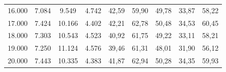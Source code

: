 \begin{table}[ht!]
\begin{tabular}{lcccccccc}
16.000              & 7.084          & 9.549          & 4.742          & 42,59                                                             & 59,90                                                          & 49,78                                                           & 33,87                                                               & 58,22                                                             \\
17.000              & 7.424          & 10.166         & 4.402          & 42,21                                                             & 62,78                                                          & 50,48                                                           & 34,53                                                               & 60,45                                                             \\
18.000              & 7.303          & 10.543         & 4.523          & 40,92                                                             & 61,75                                                          & 49,22                                                           & 33,11                                                               & 58,21                                                             \\
19.000              & 7.250          & 11.124         & 4.576          & 39,46                                                             & 61,31                                                          & 48,01                                                           & 31,90                                                               & 56,12                                                             \\
20.000              & 7.443          & 10.335         & 4.383          & 41,87                                                             & 62,94                                                          & 50,28                                                           & 34,35                                                               & 59,93                                                             \\ \hline
\end{tabular}
\end{table}

\newpage

